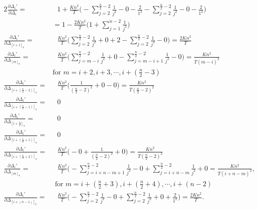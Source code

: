 \begin{alignat}{2}
\frac{\partial \Delta_i'}{\partial \Delta_i} =& \text{ }1 + \frac{Kn^2}{T} \Bigg(- \sum_{j=2}^{\frac{n}{2}-2}  \frac{1}{j^2} - 0 - \frac{2}{1^2} - \sum_{j= 2}^{\frac{n}{2}-2}  \frac{1}{j^2} - 0 - \frac{2}{1^2} \Bigg) \nonumber \\
  &= 1 - \frac{2Kn^2}{T}\Bigg(1 + \sum_{j=1}^{n-2}\frac{1}{j^2}\Bigg) \nonumber \\
\frac{\partial \Delta_i'}{\partial \Delta_{[i+1]_n}} =& \text{ }\frac{Kn^2}{T} \Bigg(\sum_{j=2}^{\frac{n}{2}-2}  \frac{1}{j^2} + 0 + 2 - \sum_{j= 2}^{\frac{n}{2}-2}  \frac{1}{j^2}- 0 \Bigg) = \frac{2Kn^2}{T} \nonumber \\
\frac{\partial \Delta_i'}{\partial \Delta_{[m]_n}} =& \text{ }\frac{Kn^2}{T} \Bigg(\sum_{j= m-i}^{\frac{n}{2}-2}  \frac{1}{j^2} + 0 - \sum_{j= m-i+1}^{\frac{n}{2}-2}  \frac{1}{j^2} - 0 \Bigg) = \frac{Kn^2}{T(m-i)^2} \nonumber \\
  &\text{for } m = i+2, i+3, \cdots, i + (\frac{n}{2} - 3) \nonumber \\
\frac{\partial \Delta_i'}{\partial \Delta_{[i+(\frac{n}{2}-2)]_n}} =& \text{ }\frac{Kn^2}{T} \Bigg( \frac{1}{(\frac{n}{2}-2)^2} + 0 - 0 \Bigg) = \frac{Kn^2}{T(\frac{n}{2}-2)^2} \nonumber \\
\frac{\partial \Delta_i'}{\partial \Delta_{[i+(\frac{n}{2}-1)]_n}} =& \text{ }0 \nonumber \ \\
\frac{\partial \Delta_i'}{\partial \Delta_{[i+\frac{n}{2}]_n}} =& \text{ }0 \nonumber \\
\frac{\partial \Delta_i'}{\partial \Delta_{[i+(\frac{n}{2}+1)]_n}} =& \text{ } 0 \nonumber \\
\frac{\partial \Delta_i'}{\partial \Delta_{[i+(\frac{n}{2}+2)]_n}} =& \text{ }\frac{Kn^2}{T} \Bigg( - 0 + \frac{1}{(\frac{n}{2}-2)^2} + 0 \Bigg) =  \frac{Kn^2}{T(\frac{n}{2}-2)^2} \nonumber \\
\frac{\partial \Delta_i'}{\partial \Delta_{[m]_n}} =& \text{ }\frac{Kn^2}{T} \Bigg(- \sum_{j= i + n -m + 1}^{\frac{n}{2}-2}  \frac{1}{j^2} - 0 + \sum_{j= i + n - m}^{\frac{n}{2}-2}  \frac{1}{j^2} + 0 = \frac{Kn^2}{T(i+n-m)^2}, \nonumber \\
  &\text{ for } m = i+(\frac{n}{2}+3), i+(\frac{n}{2}+4), \cdots, i + (n-2) \nonumber \\
\frac{\partial \Delta_i'}{\partial \Delta_{[i+(n-1)]_n}} =& \text{ }\frac{Kn^2}{T} \Bigg(- \sum_{j= 2}^{\frac{n}{2}-2}  \frac{1}{j^2} - 0 + \sum_{j=2}^{\frac{n}{2}-2}  \frac{1}{j^2} + 0 + \frac{2}{1^2} \Bigg) = \frac{2Kn^2}{T}. 
\label{eq:starcrstdiff}
\end{alignat}

